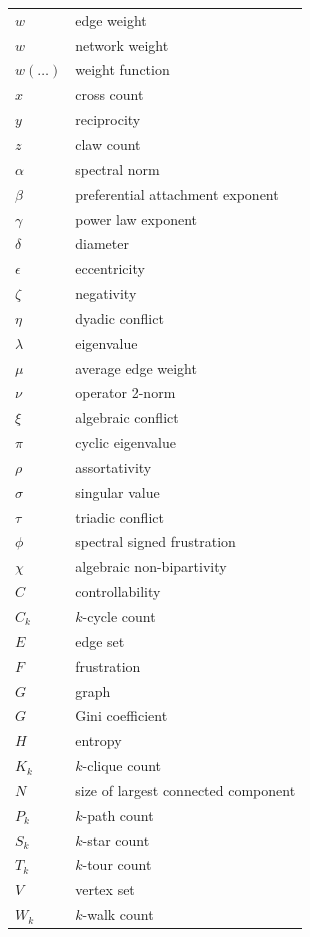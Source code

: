 \documentclass{article}
\begin{document}
\begin{longtable}{ll}
  $w$ & edge weight \\ 
  $w$ & network weight \\
  $w(\ldots)$ & weight function \\
  $x$ & cross count \\
  $y$ & reciprocity \\
  $z$ & claw count \\
  \midrule
  $\alpha$ & spectral norm \\
  $\beta$  & preferential attachment exponent \\
  $\gamma$ & power law exponent \\
  $\delta$ & diameter \\
  $\epsilon$ & eccentricity \\
  $\zeta$ & negativity \\
  $\eta$ & dyadic conflict \\
  $\lambda$ & eigenvalue \\
  $\mu$  & average edge weight \\
  $\nu$  & operator 2-norm \\
  $\xi$  & algebraic conflict \\
  $\pi$  & cyclic eigenvalue \\
  $\rho$ & assortativity \\
  $\sigma$ & singular value \\
  $\tau$ & triadic conflict \\
  $\phi$ & spectral signed frustration \\
  $\chi$ & algebraic non-bipartivity \\
  \midrule
  $C$   & controllability \\
  $C_k$ & $k$-cycle count \\
  $E$   & edge set \\
  $F$ & frustration \\
  $G$ & graph \\
  $G$ & Gini coefficient \\
  $H$ & entropy \\
  $K_k$ & $k$-clique count \\
  $N$   & size of largest connected component\\
  $P_k$ & $k$-path count \\
  $S_k$ & $k$-star count \\
  $T_k$ & $k$-tour count \\
  $V$   & vertex set \\
  $W_k$ & $k$-walk count \\
  \midrule

\end{longtable}
\end{document}
